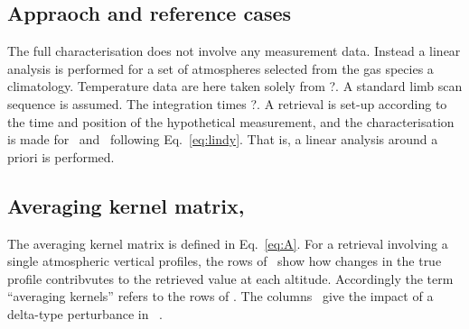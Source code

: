 \subsection{Appraoch and reference cases}
\label{sec:fullchar:select}
%
The full characterisation does not involve any measurement data. Instead a
linear analysis is performed for a set of atmospheres selected from the gas
species a climatology. Temperature data are here taken solely from
?. A standard limb scan sequence is assumed. The integration times
?. A retrieval is set-up according to the time and
position of the hypothetical measurement, and the characterisation is made for 
\aWfnMtr{\SttVct}\ and \CtrFncMtr\ following Eq.~\ref{eq:lindy}.
That is, a linear analysis around a priori is performed.
\\


\subsection{Averaging kernel matrix, \AvrKrnMtr}
\label{sec:A}
%
The averaging kernel matrix is defined in Eq.~\ref{eq:A}. For a retrieval
involving a single atmospheric vertical profiles, the rows of \AvrKrnMtr\ show
how changes in the true profile contribvutes to the retrieved value at each
altitude. Accordingly the term ``averaging kernels'' refers to the rows of
\AvrKrnMtr. The columns \AvrKrnMtr\ give the impact of a delta-type perturbance
in \SttVct\ \citep{rodgers:00}.

